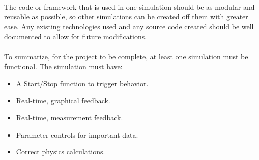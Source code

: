 \documentclass[10pt]{article}
\begin{document}
\paragraph{} The code or framework that is used in one simulation should be as modular and reusable as possible, so other simulations can be created off them with greater ease. Any existing technologies used and any source code created should be well documented to allow for future modifications.

\paragraph{}To summarize, for the project to be complete, at least one simulation must be functional. The simulation must have:

\begin{itemize}
  \item A Start/Stop function to trigger behavior.
  \item Real-time, graphical feedback.
  \item Real-time, measurement feedback.
  \item Parameter controls for important data.
  \item Correct physics calculations.
\end{itemize}
\end{document}

